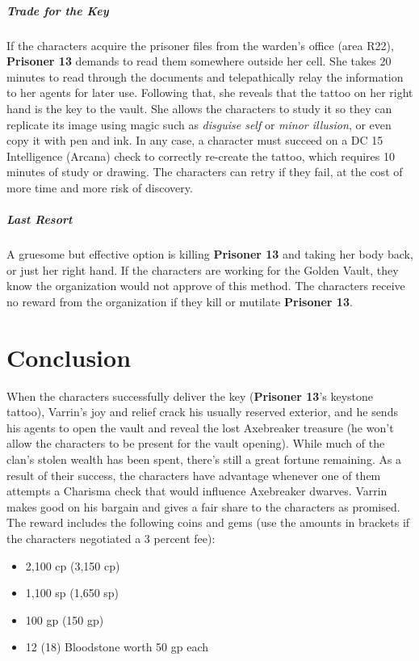 \documentclass[10pt,a4paper,twoside,bg=print,twocolumn,openany,nodeprecatedcode]{dndbook}
\begin{document}
\subparagraph{Trade for the Key}
If the characters acquire the prisoner files from the warden's office (area R22), \textbf{Prisoner 13} demands to read them somewhere outside her cell. She takes 20 minutes to read through the documents and telepathically relay the information to her agents for later use. Following that, she reveals that the tattoo on her right hand is the key to the vault. She allows the characters to study it so they can replicate its image using magic such as \textit{disguise self} or \textit{minor illusion}, or even copy it with pen and ink. In any case, a character must succeed on a DC 15 Intelligence (Arcana) check to correctly re-create the tattoo, which requires 10 minutes of study or drawing. The characters can retry if they fail, at the cost of more time and more risk of discovery.

\subparagraph{Last Resort}
A gruesome but effective option is killing \textbf{Prisoner 13} and taking her body back, or just her right hand. If the characters are working for the Golden Vault, they know the organization would not approve of this method. The characters receive no reward from the organization if they kill or mutilate \textbf{Prisoner 13}.

\section{Conclusion}
When the characters successfully deliver the key (\textbf{Prisoner 13}'s keystone tattoo), Varrin's joy and relief crack his usually reserved exterior, and he sends his agents to open the vault and reveal the lost Axebreaker treasure (he won't allow the characters to be present for the vault opening). While much of the clan's stolen wealth has been spent, there's still a great fortune remaining. As a result of their success, the characters have advantage whenever one of them attempts a Charisma check that would influence Axebreaker dwarves. Varrin makes good on his bargain and gives a fair share to the characters as promised. The reward includes the following coins and gems (use the amounts in brackets if the characters negotiated a 3 percent fee):


\begin{itemize}
\item 2,100 cp (3,150 cp)
\item 1,100 sp (1,650 sp)
\item 100 gp (150 gp)
\item 12 (18) Bloodstone worth 50 gp each
\end{itemize}
\end{document}
